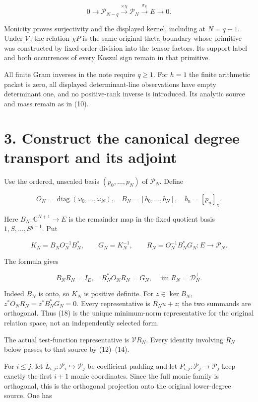 \documentclass[
  11pt,
]{article}
\begin{document}
\[
 0\longrightarrow\mathcal P_{N-q}
 \xrightarrow{\times\chi}\mathcal P_N
 \xrightarrow{\pi_\chi}E\longrightarrow0.                         \tag{16}
\]

Monicity proves surjectivity and the displayed kernel, including at
\(N=q-1\). Under \(\mathcal V\), the relation \(\chi P\) is the same
original theta boundary whose primitive was constructed by fixed-order
division into the tensor factors. Its support label and both occurrences
of every Koszul sign remain in that primitive.

All finite Gram inverses in the note require \(q\ge1\). For \(h=1\) the
finite arithmetic packet is zero, all displayed determinant-line
observations have empty determinant one, and no positive-rank inverse is
introduced. Its analytic source and mass remain as in (10).

\section{3. Construct the canonical degree transport and its
adjoint}\label{construct-the-canonical-degree-transport-and-its-adjoint}

Use the ordered, unscaled basis \((p_0,\ldots,p_N)\) of
\(\mathcal P_N\). Define

\[
 O_N=\operatorname{diag}(\omega_0,\ldots,\omega_N),\quad
 B_N=[b_0,\ldots,b_N],\quad b_n=[p_n]_\chi.                         \tag{17}
\]

Here \(B_N:\mathbb C^{N+1}\to E\) is the remainder map in the fixed
quotient basis \(1,S,\ldots,S^{q-1}\). Put

\[
 K_N=B_NO_N^{-1}B_N^*,\qquad G_N=K_N^{-1},\qquad
 R_N=O_N^{-1}B_N^*G_N:E\to\mathcal P_N.                            \tag{18}
\]

The formula gives

\[
 B_NR_N=I_E,\quad R_N^*O_NR_N=G_N,\quad
 \operatorname{im}R_N=\mathcal D_N^\perp.                          \tag{19}
\]

Indeed \(B_N\) is onto, so \(K_N\) is positive definite. For
\(z\in\ker B_N\), \(z^*O_NR_N=z^*B_N^*G_N=0\). Every representative is
\(R_Nu+z\); the two summands are orthogonal. Thus (18) is the unique
minimum-norm representative for the original relation space, not an
independently selected form.

The actual test-function representative is \(\mathcal V R_N\). Every
identity involving \(R_N\) below passes to that source by (12)--(14).

For \(i\le j\), let \(L_{i,j}:\mathcal P_i\hookrightarrow\mathcal P_j\)
be coefficient padding and let \(P_{i,j}:\mathcal P_j\to\mathcal P_j\)
keep exactly the first \(i+1\) monic coordinates. Since the full monic
family is orthogonal, this is the orthogonal projection onto the
original lower-degree source. One has
\end{document}

